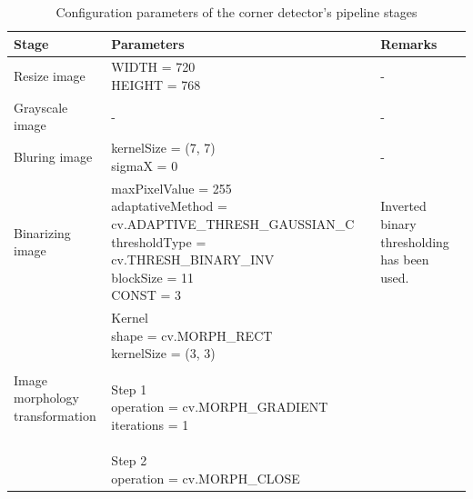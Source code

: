 \documentclass{scrartcl}
\newcommand{\param}[1]{{\ttfamily\footnotesize{#1}}}
\begin{document}
  \begin{table}[htbp]
    \centering
    \caption{Configuration parameters of the corner detector's pipeline stages}
    \begin{tabular}{ | l | l | l |}
      \hline
      \textbf{Stage} & \textbf{Parameters} & \textbf{Remarks} \\
      \hline \hline
        Resize image
        &
        \makecell[l]{
          \param{WIDTH = 720} \\
          \param{HEIGHT = 768}
        }
        &
        -
      \\
      \hline
        Grayscale image
        &
        -
        &
        -
      \\
      \hline
        Bluring image
        &
        \makecell[l]{
          \param{kernelSize = (7, 7)} \\
          \param{sigmaX = 0} \\
        }
        &
        -
      \\
      \hline
        Binarizing image
        &
        \makecell[l]{
          \param{maxPixelValue = 255} \\
          \param{adaptativeMethod = cv.ADAPTIVE\_THRESH\_GAUSSIAN\_C} \\
          \param{thresholdType = cv.THRESH\_BINARY\_INV} \\
          \param{blockSize = 11} \\
          \param{CONST = 3}
        }
        &
        \makecell[l]{
          Inverted binary thresholding \\
          has been used.
        }
      \\
      \hline
        \makecell[l]{
          Image morphology \\
          transformation
        }
        &
          \makecell[l] {
            Kernel \\
            \param{shape = cv.MORPH\_RECT} \\
            \param{kernelSize = (3, 3)} \\
            \\
            Step 1 \\
            \param{operation = cv.MORPH\_GRADIENT} \\
            \param{iterations = 1} \\
            \\
            Step 2 \\
            \param{operation = cv.MORPH\_CLOSE} \\
}
\end{tabular}
\end{table}
\end{document}
